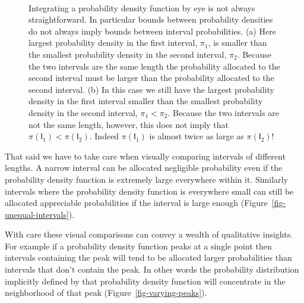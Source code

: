 \documentclass[
  letterpaper,
  DIV=11,
  numbers=noendperiod]{scrartcl}
\begin{document}
\begin{figure}
\begin{minipage}[t]{0.49\linewidth}
{{}

}

\subcaption{\label{fig-unequal-intervals}}
\end{minipage}%
%
\begin{minipage}[t]{0.01\linewidth}

{\centering 

~

}

\end{minipage}%

\caption{\label{fig-area-comps}Integrating a probability density
function by eye is not always straightforward. In particular bounds
between probability densities do not always imply bounds between
interval probabilities. (a) Here largest probability density in the
first interval, \(\pi_{1}\), is smaller than the smallest probability
density in the second interval, \(\pi_{2}\). Because the two intervals
are the same length the probability allocated to the second interval
must be larger than the probability allocated to the second interval.
(b) In this case we still have the largest probability density in the
first interval smaller than the smallest probability density in the
second interval, \(\pi_{1} < \pi_{2}\). Because the two intervals are
not the same length, however, this does not imply that
\(\pi(\mathsf{I}_{1}) < \pi(\mathsf{I}_{2})\). Indeed
\(\pi(\mathsf{I}_{1})\) is almost twice as large as
\(\pi(\mathsf{I}_{2})\)!}

\end{figure}

That said we have to take care when visually comparing intervals of
different lengths. A narrow interval can be allocated negligible
probability even if the probability density function is extremely large
everywhere within it. Similarly intervals where the probability density
function is everywhere small can still be allocated appreciable
probabilities if the interval is large enough
(Figure~\ref{fig-unequal-intervals}).

With care these visual comparisons can convey a wealth of qualitative
insights. For example if a probability density function peaks at a
single point then intervals containing the peak will tend to be
allocated larger probabilities than intervals that don't contain the
peak. In other words the probability distribution implicitly defined by
that probability density function will concentrate in the neighborhood
of that peak (Figure~\ref{fig-varying-peaks}).
\end{document}
